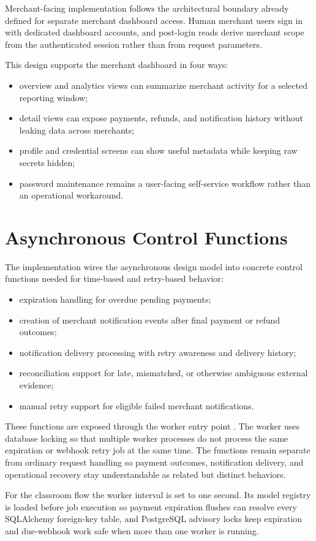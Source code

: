 Merchant-facing implementation follows the architectural boundary already
defined for separate merchant dashboard access. Human merchant users sign in
with dedicated dashboard accounts, and post-login reads derive merchant scope
from the authenticated session rather than from request parameters.

This design supports the merchant dashboard in four ways:

\begin{itemize}
  \item overview and analytics views can summarize merchant activity for a
  selected reporting window;
  \item detail views can expose payments, refunds, and notification history
  without leaking data across merchants;
  \item profile and credential screens can show useful metadata while keeping
  raw secrets hidden;
  \item password maintenance remains a user-facing self-service workflow rather
  than an operational workaround.
\end{itemize}

\section{Asynchronous Control Functions}

The implementation wires the asynchronous design model into concrete control
functions needed for time-based and retry-based behavior:

\begin{itemize}
  \item expiration handling for overdue pending payments;
  \item creation of merchant notification events after final payment or refund
  outcomes;
  \item notification delivery processing with retry awareness and delivery
  history;
  \item reconciliation support for late, mismatched, or otherwise ambiguous
  external evidence;
  \item manual retry support for eligible failed merchant notifications.
\end{itemize}

These functions are exposed through the worker entry point
. The worker uses database locking so that
multiple worker processes do not process the same expiration or webhook retry
job at the same time. The functions remain separate from ordinary request
handling so payment outcomes, notification delivery, and operational recovery
stay understandable as related but distinct behaviors.

For the classroom flow the worker interval is set to one second. Its model
registry is loaded before job execution so payment expiration flushes can
resolve every SQLAlchemy foreign-key table, and PostgreSQL advisory locks keep
expiration and due-webhook work safe when more than one worker is running.
